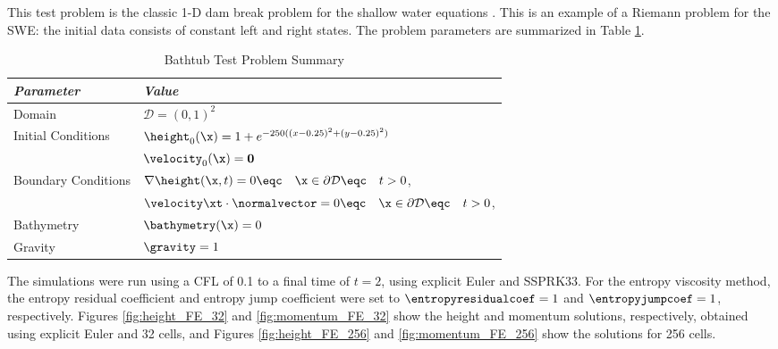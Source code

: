 This test problem is the classic 1-D dam break problem for the shallow
water equations \cite{leveque2002}. This is an example of a Riemann problem
for the SWE: the initial data consists of constant left and right states.
The problem parameters are summarized in Table \ref{tab:dam_break_1d}.

\begin{table}[htb]\caption{Bathtub Test Problem Summary}
\label{tab:dam_break_1d}
\centering
\begin{tabular}{l l}\toprule
\emph{Parameter} & \emph{Value}\\\midrule
Domain & $\mathcal{D} = (0,1)^2$\\
Initial Conditions & $\height_0(\x)=1 + e^{-250((x-0.25)^2+(y-0.25)^2)}$\\
                   & $\velocity_0(\x) = \mathbf{0}$\\
Boundary Conditions & $\nabla\height(\x,t)=0
  \eqc \quad \x\in\partial\mathcal{D}\eqc \quad t>0$,\\
                    & $\velocity\xt\cdot\normalvector = 0
  \eqc \quad \x\in\partial\mathcal{D}\eqc \quad t>0$,\\
Bathymetry & $\bathymetry(\x)=0$\\
Gravity    & $\gravity=1$\\
\bottomrule\end{tabular}
\end{table}

The simulations were run using a CFL of 0.1 to a final time of $t=2$,
using explicit Euler and SSPRK33.
For the entropy viscosity method, the entropy residual coefficient
and entropy jump coefficient were set to $\entropyresidualcoef=1$
and $\entropyjumpcoef=1$, respectively.
Figures \ref{fig:height_FE_32} and \ref{fig:momentum_FE_32} 
show the height and momentum solutions, respectively, obtained using explicit Euler
and 32 cells, and Figures \ref{fig:height_FE_256} and \ref{fig:momentum_FE_256} 
show the solutions for 256 cells.

